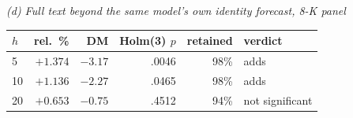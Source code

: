 \begin{table}[htbp]
\vspace{1.2ex}
\emph{(d) Full text beyond the same model's own identity forecast, 8-K panel}\\[0.4ex]
\begin{tabular}{@{}lrrrrl@{}}
\toprule
$h$ & rel.\ \% & DM & Holm(3) $p$ & retained & verdict \\
\midrule
5  & $+1.374$ & $-3.17$ & .0046 & 98\% & adds \\
10 & $+1.136$ & $-2.27$ & .0465 & 98\% & adds \\
20 & $+0.653$ & $-0.75$ & .4512 & 94\% & not significant \\
\bottomrule
\end{tabular}
\end{table}



